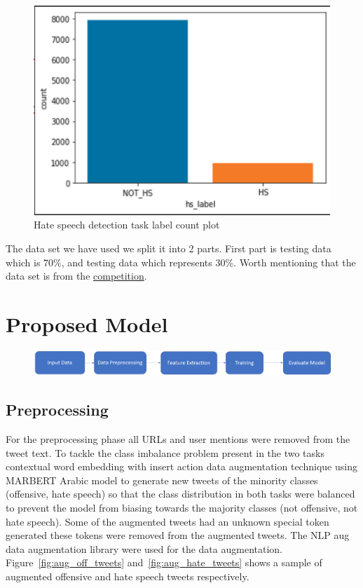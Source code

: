 \documentclass[conference]{IEEEtran}
\begin{document}
\begin{figure}[htbp]
	\includegraphics[width=\columnwidth, height=0.30\paperwidth]{07.png}
	\caption{Hate speech detection task label count plot}
	\label{fig:hate_speech}
\end{figure}

The data set we have used we split it into 2 parts. First part is testing data which is 70\%, and testing data which represents 30\%. Worth mentioning that the data set is from the \href{https://sites.google.com/view/arabichate2022/home}{competition}.

\section{Proposed Model}

\begin{figure}[htbp]
	\includegraphics[width=\columnwidth, height=0.04\textheight]{04.png}
\end{figure}

\subsection{Preprocessing}
For the preprocessing phase all URLs and user mentions were removed from the tweet text. To tackle the class imbalance problem present in the two tasks contextual word embedding with insert action data augmentation technique using MARBERT Arabic model to generate new tweets of the minority classes (offensive, hate speech) so that the class distribution in both tasks were balanced to prevent the model from biasing towards the majority classes (not offensive, not hate speech). Some of the augmented tweets had an unknown special token generated these tokens were removed from the augmented tweets. The NLP aug ~\cite{al2020hate} data augmentation library were used for the data augmentation. Figure~\ref{fig:aug_off_tweets} and~\ref{fig:aug_hate_tweets} shows a sample of augmented offensive and hate speech tweets respectively.
\end{document}
